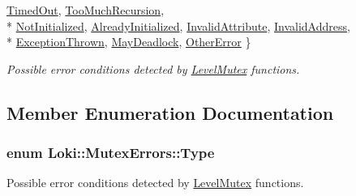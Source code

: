\begin{DoxyCompactItemize}
\hyperlink{classLoki_1_1MutexErrors_acd0eb6065ca303083d2e0229d7bff590a9f3e0a8421cc0f364f80797ccf0dd772}{Timed\+Out}, 
\hyperlink{classLoki_1_1MutexErrors_acd0eb6065ca303083d2e0229d7bff590a883b8a88a3320b80c6b3d33e5d73b88d}{Too\+Much\+Recursion}, 
\\*
\hyperlink{classLoki_1_1MutexErrors_acd0eb6065ca303083d2e0229d7bff590a7786fe0c8d9915f431dd1e0996bdd8d6}{Not\+Initialized}, 
\hyperlink{classLoki_1_1MutexErrors_acd0eb6065ca303083d2e0229d7bff590a18645169fa80f64022a8dddfbfc017ff}{Already\+Initialized}, 
\hyperlink{classLoki_1_1MutexErrors_acd0eb6065ca303083d2e0229d7bff590aec7e67439e1a3540e60c9acd6032cdce}{Invalid\+Attribute}, 
\hyperlink{classLoki_1_1MutexErrors_acd0eb6065ca303083d2e0229d7bff590a1f1bc59b1a6669e493a488200486485d}{Invalid\+Address}, 
\\*
\hyperlink{classLoki_1_1MutexErrors_acd0eb6065ca303083d2e0229d7bff590a86ee8c02305dbc02a61070e9912bee22}{Exception\+Thrown}, 
\hyperlink{classLoki_1_1MutexErrors_acd0eb6065ca303083d2e0229d7bff590a7b3cc9a416dfa15b7877e978a1ca4aee}{May\+Deadlock}, 
\hyperlink{classLoki_1_1MutexErrors_acd0eb6065ca303083d2e0229d7bff590a7160943d5a3247df7515bd4005ce2d62}{Other\+Error}
 \}\begin{DoxyCompactList}\small\item\em Possible error conditions detected by \hyperlink{classLoki_1_1LevelMutex}{Level\+Mutex} functions. \end{DoxyCompactList}
\end{DoxyCompactItemize}


\subsection{Member Enumeration Documentation}
\hypertarget{classLoki_1_1MutexErrors_acd0eb6065ca303083d2e0229d7bff590}{}
\subsubsection[{Type}]{\setlength{\rightskip}{0pt plus 5cm}enum {\bf Loki\+::\+Mutex\+Errors\+::\+Type}}\label{classLoki_1_1MutexErrors_acd0eb6065ca303083d2e0229d7bff590}


Possible error conditions detected by \hyperlink{classLoki_1_1LevelMutex}{Level\+Mutex} functions. 

